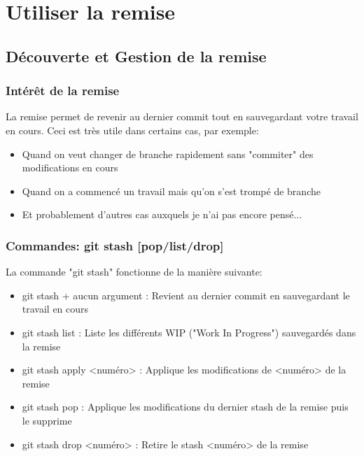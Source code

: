 \documentclass{beamer}
\begin{document}
\section{Utiliser la remise}

\subsection{Découverte et Gestion de la remise}
\begin{frame}
\frametitle{Intérêt de la remise}
La remise permet de revenir au dernier commit tout en sauvegardant votre travail en cours. Ceci est très utile dans certains cas, par exemple:
\begin{itemize}
    \item Quand on veut changer de branche rapidement sans "commiter" des modifications en cours
    \item Quand on a commencé un travail mais qu'on s'est trompé de branche
    \item Et probablement d'autres cas auxquels je n'ai pas encore pensé...
\end{itemize}

\end{frame}

\begin{frame}
\frametitle{Commandes: git stash [pop/list/drop]}

La commande "git stash" fonctionne de la manière suivante:
\begin{itemize}
    \item git stash + aucun argument : Revient au dernier commit en sauvegardant le travail en cours
    \item git stash list : Liste les différents WIP ("Work In Progress") sauvegardés dans la remise
    \item git stash apply <numéro> : Applique les modifications de <numéro> de la remise
    \item git stash pop : Applique les modifications du dernier stash de la remise puis le supprime
    \item git stash drop <numéro> : Retire le stash <numéro> de la remise
\end{itemize}

\end{frame}
\end{document}
